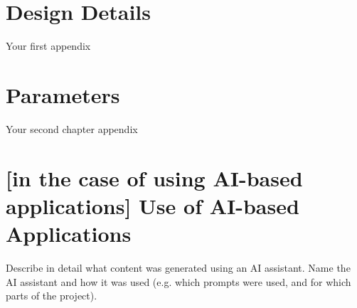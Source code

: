 \documentclass[../thesis.tex]{subfiles}
\begin{document}
    \chapter{Design Details}
    Your first appendix

    \chapter{Parameters}
    Your second chapter appendix

    \chapter{[in the case of using AI-based applications] Use of AI-based Applications}
    Describe in detail what content was generated using an AI assistant.
    Name the AI assistant and how it was used (e.g. which prompts were used, and for which parts of the project).
\end{document}
